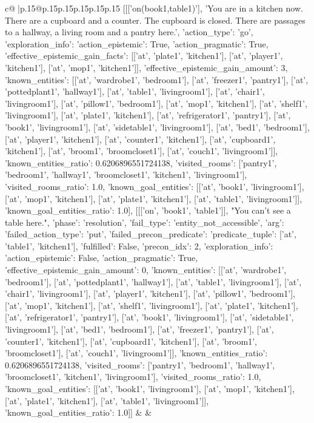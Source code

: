 \documentclass{article}
\begin{document}
{\begin{supertabular}{c@{$\;$}|p{.15\linewidth}@{}p{.15\linewidth}p{.15\linewidth}p{.15\linewidth}p{.15\linewidth}p{.15\linewidth}}
{{{	 [[['on(book1,table1)'], 'You are in a kitchen now. There are a cupboard and a counter. The cupboard is closed. There are passages to a hallway, a living room and a pantry here.', {'action_type': 'go', 'exploration_info': {'action_epistemic': True, 'action_pragmatic': True, 'effective_epistemic_gain_facts': [['at', 'plate1', 'kitchen1'], ['at', 'player1', 'kitchen1'], ['at', 'mop1', 'kitchen1']], 'effective_epistemic_gain_amount': 3, 'known_entities': [['at', 'wardrobe1', 'bedroom1'], ['at', 'freezer1', 'pantry1'], ['at', 'pottedplant1', 'hallway1'], ['at', 'table1', 'livingroom1'], ['at', 'chair1', 'livingroom1'], ['at', 'pillow1', 'bedroom1'], ['at', 'mop1', 'kitchen1'], ['at', 'shelf1', 'livingroom1'], ['at', 'plate1', 'kitchen1'], ['at', 'refrigerator1', 'pantry1'], ['at', 'book1', 'livingroom1'], ['at', 'sidetable1', 'livingroom1'], ['at', 'bed1', 'bedroom1'], ['at', 'player1', 'kitchen1'], ['at', 'counter1', 'kitchen1'], ['at', 'cupboard1', 'kitchen1'], ['at', 'broom1', 'broomcloset1'], ['at', 'couch1', 'livingroom1']], 'known_entities_ratio': 0.6206896551724138, 'visited_rooms': ['pantry1', 'bedroom1', 'hallway1', 'broomcloset1', 'kitchen1', 'livingroom1'], 'visited_rooms_ratio': 1.0, 'known_goal_entities': [['at', 'book1', 'livingroom1'], ['at', 'mop1', 'kitchen1'], ['at', 'plate1', 'kitchen1'], ['at', 'table1', 'livingroom1']], 'known_goal_entities_ratio': 1.0}}], [[['on', 'book1', 'table1']], "You can't see a table here.", {'phase': 'resolution', 'fail_type': 'entity_not_accessible', 'arg': {'failed_action_type': 'put', 'failed_precon_predicate': {'predicate_tuple': ['at', 'table1', 'kitchen1'], 'fulfilled': False, 'precon_idx': 2}}, 'exploration_info': {'action_epistemic': False, 'action_pragmatic': True, 'effective_epistemic_gain_amount': 0, 'known_entities': [['at', 'wardrobe1', 'bedroom1'], ['at', 'pottedplant1', 'hallway1'], ['at', 'table1', 'livingroom1'], ['at', 'chair1', 'livingroom1'], ['at', 'player1', 'kitchen1'], ['at', 'pillow1', 'bedroom1'], ['at', 'mop1', 'kitchen1'], ['at', 'shelf1', 'livingroom1'], ['at', 'plate1', 'kitchen1'], ['at', 'refrigerator1', 'pantry1'], ['at', 'book1', 'livingroom1'], ['at', 'sidetable1', 'livingroom1'], ['at', 'bed1', 'bedroom1'], ['at', 'freezer1', 'pantry1'], ['at', 'counter1', 'kitchen1'], ['at', 'cupboard1', 'kitchen1'], ['at', 'broom1', 'broomcloset1'], ['at', 'couch1', 'livingroom1']], 'known_entities_ratio': 0.6206896551724138, 'visited_rooms': ['pantry1', 'bedroom1', 'hallway1', 'broomcloset1', 'kitchen1', 'livingroom1'], 'visited_rooms_ratio': 1.0, 'known_goal_entities': [['at', 'book1', 'livingroom1'], ['at', 'mop1', 'kitchen1'], ['at', 'plate1', 'kitchen1'], ['at', 'table1', 'livingroom1']], 'known_goal_entities_ratio': 1.0}}]] 
	  } 
	   } 
	   } 
	 & & \\ 
 


\end{supertabular}}
\end{document}
